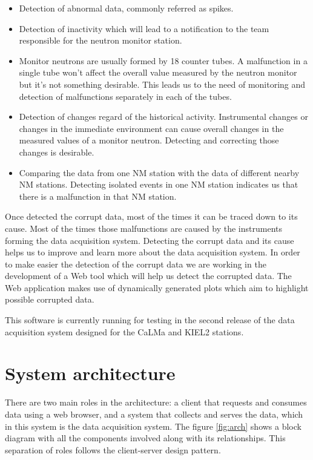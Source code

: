 \documentclass[a4paper]{jpconf}
\begin{document}
\begin{itemize}
	\item   Detection of abnormal data, commonly referred as spikes.
    \item   Detection of inactivity which will lead to a notification to the
        team responsible for the neutron monitor station.
    \item   Monitor neutrons are usually formed by 18 counter tubes. A
        malfunction in a single tube won't affect the overall value measured by
        the neutron monitor but it's not something desirable. This leads us to
        the need of monitoring and detection of malfunctions separately in each
        of the tubes.  
    \item	Detection of changes regard of the historical activity.
        Instrumental changes or changes in the immediate environment can cause
        overall changes in the measured values of a monitor neutron. Detecting
        and correcting those changes is desirable.
    \item 	Comparing the data from one NM station with the data of different
        nearby NM stations. Detecting isolated events in one NM station
        indicates us that there is a malfunction in that NM station.	
\end{itemize}

Once detected the corrupt data, most of the times it can be traced down to its
cause. Most of the times those malfunctions are caused by the instruments
forming the data acquisition system. Detecting the corrupt data and its cause
helps us to improve and learn more about the data acquisition system. In order
to make easier the detection of the corrupt data we are working in the
development of a Web tool which will help us detect the corrupted data. The Web
application makes use of dynamically generated plots which aim to highlight
possible corrupted data.

This software is currently running for testing in the second release of the data
acquisition system\cite{Garcia2014} designed for the CaLMa\cite{Medina2013} and
KIEL2 stations.


\section{System architecture}

There are two main roles in the architecture: a client that requests and
consumes data using a web browser, and a system that collects and serves the
data, which in this system is the data acquisition system. The figure
\ref{fig:arch} shows a block diagram with all the components involved along with
its relationships. This separation of roles follows the client-server design
pattern\cite{wiki:ClientServer}.
\end{document}
